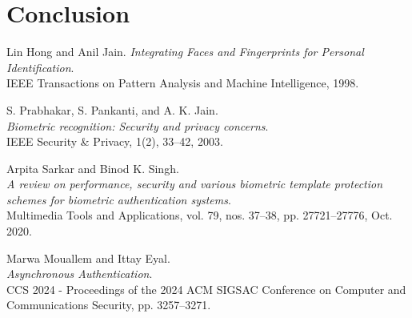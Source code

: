 \documentclass{article}
\begin{document}
\section{Conclusion}
\begin{thebibliography}{9}

Lin Hong and Anil Jain.
\textit{Integrating Faces and Fingerprints for Personal Identification}.\\
IEEE Transactions on Pattern Analysis and Machine Intelligence, 1998.

S. Prabhakar, S. Pankanti, and A. K. Jain.\\
\textit{Biometric recognition: Security and privacy concerns}.\\
IEEE Security \& Privacy, 1(2), 33–42, 2003.

Arpita Sarkar and Binod K. Singh.\\
\textit{A review on performance, security and various biometric template protection schemes for biometric authentication systems}.\\
Multimedia Tools and Applications, vol. 79, nos. 37–38, pp. 27721–27776, Oct. 2020.

Marwa Mouallem and Ittay Eyal.\\
\textit{Asynchronous Authentication}.\\
CCS 2024 - Proceedings of the 2024 ACM SIGSAC Conference on Computer and Communications Security, pp. 3257–3271.

\end{thebibliography}
\end{document}
